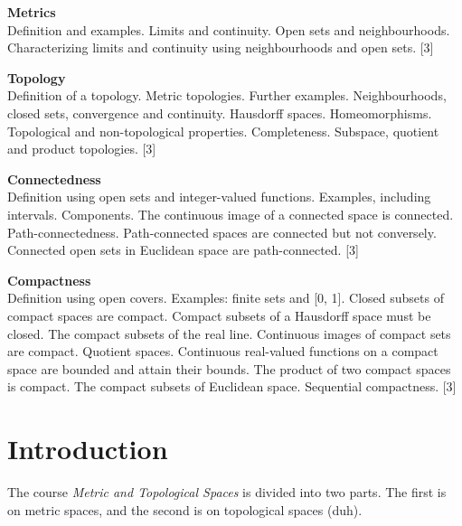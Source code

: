 \documentclass[a4paper]{article}
\begin{document}
\maketitle
{\small
\noindent\textbf{Metrics}\\
Definition and examples. Limits and continuity. Open sets and neighbourhoods. Characterizing limits and continuity using neighbourhoods and open sets.\hspace*{\fill} [3]

\vspace{10pt}
\noindent\textbf{Topology}\\
Definition of a topology. Metric topologies. Further examples. Neighbourhoods, closed sets, convergence and continuity. Hausdorff spaces. Homeomorphisms. Topological and non-topological properties. Completeness. Subspace, quotient and product topologies.\hspace*{\fill} [3]

\vspace{10pt}
\noindent\textbf{Connectedness}\\
Definition using open sets and integer-valued functions. Examples, including intervals. Components. The continuous image of a connected space is connected. Path-connectedness. Path-connected spaces are connected but not conversely. Connected open sets in Euclidean space are path-connected.\hspace*{\fill} [3]

\vspace{10pt}
\noindent\textbf{Compactness}\\
Definition using open covers. Examples: finite sets and [0, 1]. Closed subsets of compact spaces are compact. Compact subsets of a Hausdorff space must be closed. The compact subsets of the real line. Continuous images of compact sets are compact. Quotient spaces. Continuous real-valued functions on a compact space are bounded and attain their bounds. The product of two compact spaces is compact. The compact subsets of Euclidean space. Sequential compactness.\hspace*{\fill} [3]}

\tableofcontents
\setcounter{section}{-1}
\section{Introduction}
The course \emph{Metric and Topological Spaces} is divided into two parts. The first is on metric spaces, and the second is on topological spaces (duh).
\end{document}
